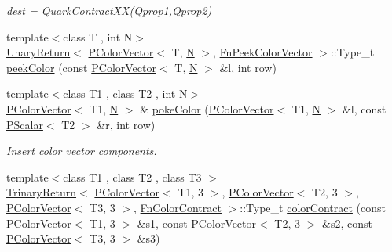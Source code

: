 \begin{DoxyCompactItemize}
\begin{DoxyCompactList}\small\item\em dest = Quark\+Contract\+X\+X(\+Qprop1,\+Qprop2) \end{DoxyCompactList}\item 
{\footnotesize template$<$class T , int N$>$ }\\\mbox{\hyperlink{structENSEM_1_1UnaryReturn}{Unary\+Return}}$<$ \mbox{\hyperlink{classENSEM_1_1PColorVector}{P\+Color\+Vector}}$<$ T, \mbox{\hyperlink{operator__name__util_8cc_a7722c8ecbb62d99aee7ce68b1752f337}{N}} $>$, \mbox{\hyperlink{structENSEM_1_1FnPeekColorVector}{Fn\+Peek\+Color\+Vector}} $>$\+::Type\+\_\+t \mbox{\hyperlink{namespaceENSEM_a795563dd1752d6dee39fee8212b66d34}{peek\+Color}} (const \mbox{\hyperlink{classENSEM_1_1PColorVector}{P\+Color\+Vector}}$<$ T, \mbox{\hyperlink{operator__name__util_8cc_a7722c8ecbb62d99aee7ce68b1752f337}{N}} $>$ \&l, int row)
\item 
{\footnotesize template$<$class T1 , class T2 , int N$>$ }\\\mbox{\hyperlink{classENSEM_1_1PColorVector}{P\+Color\+Vector}}$<$ T1, \mbox{\hyperlink{operator__name__util_8cc_a7722c8ecbb62d99aee7ce68b1752f337}{N}} $>$ \& \mbox{\hyperlink{namespaceENSEM_a2f18aee00e855aafa93d3931e3fa1d1a}{poke\+Color}} (\mbox{\hyperlink{classENSEM_1_1PColorVector}{P\+Color\+Vector}}$<$ T1, \mbox{\hyperlink{operator__name__util_8cc_a7722c8ecbb62d99aee7ce68b1752f337}{N}} $>$ \&l, const \mbox{\hyperlink{classENSEM_1_1PScalar}{P\+Scalar}}$<$ T2 $>$ \&r, int row)
\begin{DoxyCompactList}\small\item\em Insert color vector components. \end{DoxyCompactList}\item 
{\footnotesize template$<$class T1 , class T2 , class T3 $>$ }\\\mbox{\hyperlink{structENSEM_1_1TrinaryReturn}{Trinary\+Return}}$<$ \mbox{\hyperlink{classENSEM_1_1PColorVector}{P\+Color\+Vector}}$<$ T1, 3 $>$, \mbox{\hyperlink{classENSEM_1_1PColorVector}{P\+Color\+Vector}}$<$ T2, 3 $>$, \mbox{\hyperlink{classENSEM_1_1PColorVector}{P\+Color\+Vector}}$<$ T3, 3 $>$, \mbox{\hyperlink{structENSEM_1_1FnColorContract}{Fn\+Color\+Contract}} $>$\+::Type\+\_\+t \mbox{\hyperlink{namespaceENSEM_a7858a8fd90447e56b22d0e84f6059d3f}{color\+Contract}} (const \mbox{\hyperlink{classENSEM_1_1PColorVector}{P\+Color\+Vector}}$<$ T1, 3 $>$ \&s1, const \mbox{\hyperlink{classENSEM_1_1PColorVector}{P\+Color\+Vector}}$<$ T2, 3 $>$ \&s2, const \mbox{\hyperlink{classENSEM_1_1PColorVector}{P\+Color\+Vector}}$<$ T3, 3 $>$ \&s3)

\end{DoxyCompactItemize}
